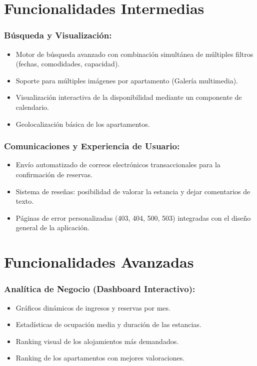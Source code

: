 \section{Funcionalidades Intermedias}

\subsubsection{Búsqueda y Visualización:}
\begin{itemize}
    \item Motor de búsqueda avanzado con combinación simultánea de múltiples filtros (fechas, comodidades, capacidad).
    \item Soporte para múltiples imágenes por apartamento (Galería multimedia).
    \item Visualización interactiva de la disponibilidad mediante un componente de calendario.
    \item Geolocalización básica de los apartamentos.
\end{itemize}


\subsubsection{Comunicaciones y Experiencia de Usuario:}
\begin{itemize}
    \item Envío automatizado de correos electrónicos transaccionales para la confirmación de reservas.
    \item Sistema de reseñas: posibilidad de valorar la estancia y dejar comentarios de texto.
    \item Páginas de error personalizadas (403, 404, 500, 503) integradas con el diseño general de la aplicación.
\end{itemize}

\section{Funcionalidades Avanzadas}

\subsubsection{Analítica de Negocio (Dashboard Interactivo):}
\begin{itemize}
    \item Gráficos dinámicos de ingresos y reservas por mes.
    \item Estadísticas de ocupación media y duración de las estancias.
    \item Ranking visual de los alojamientos más demandados.
    \item Ranking de los apartamentos con mejores valoraciones.
\end{itemize}


